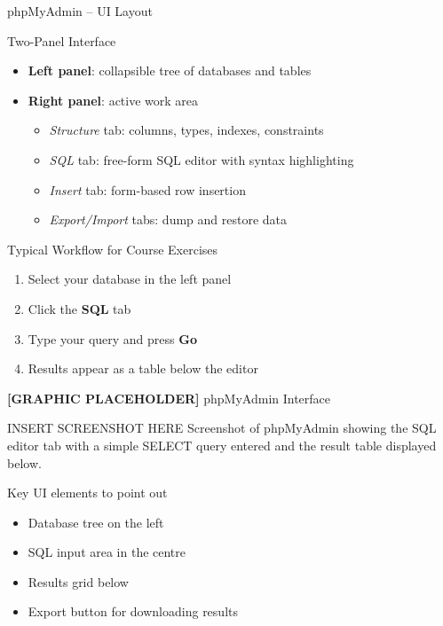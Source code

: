 \begin{frame}{phpMyAdmin -- UI Layout}
  \begin{block}{Two-Panel Interface}
    \begin{itemize}
      \item \textbf{Left panel}: collapsible tree of databases and tables
      \item \textbf{Right panel}: active work area
        \begin{itemize}
          \item \textit{Structure} tab: columns, types, indexes, constraints
          \item \textit{SQL} tab: free-form SQL editor with syntax highlighting
          \item \textit{Insert} tab: form-based row insertion
          \item \textit{Export/Import} tabs: dump and restore data
        \end{itemize}
    \end{itemize}
  \end{block}

  \begin{examples}{Typical Workflow for Course Exercises}
    \begin{enumerate}
      \item Select your database in the left panel
      \item Click the \textbf{SQL} tab
      \item Type your query and press \textbf{Go}
      \item Results appear as a table below the editor
    \end{enumerate}
  \end{examples}
\end{frame}

\begin{frame}{\textbf{[GRAPHIC PLACEHOLDER]} phpMyAdmin Interface}
  \begin{alertblock}{INSERT SCREENSHOT HERE}
    Screenshot of phpMyAdmin showing the SQL editor tab with a simple
    SELECT query entered and the result table displayed below.
  \end{alertblock}

  \begin{block}{Key UI elements to point out}
    \begin{itemize}
      \item Database tree on the left
      \item SQL input area in the centre
      \item Results grid below
      \item Export button for downloading results
    \end{itemize}
  \end{block}
\end{frame}
